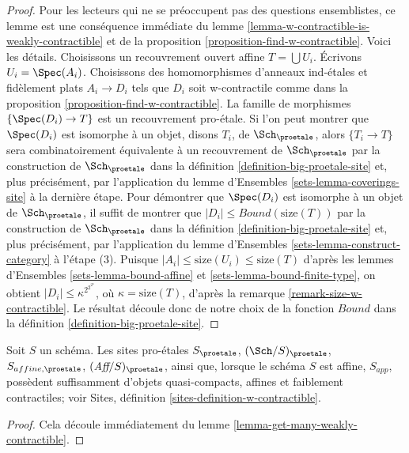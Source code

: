 \begin{proof}
Pour les lecteurs qui ne se préoccupent pas des questions ensemblistes,
ce lemme est une conséquence immédiate du
lemme \ref{lemma-w-contractible-is-weakly-contractible} et de la
proposition \ref{proposition-find-w-contractible}.
Voici les détails.
Choisissons un recouvrement ouvert affine $T = \bigcup U_i$. Écrivons $U_i = \Spec(A_i)$.
Choisissons des homomorphismes d'anneaux ind-\'etales et fidèlement plats $A_i \to D_i$
tels que $D_i$ soit w-contractile comme dans la
proposition \ref{proposition-find-w-contractible}.
La famille de morphismes $\{\Spec(D_i) \to T\}$ est un
recouvrement pro-\'etale.
Si l'on peut montrer que $\Spec(D_i)$ est isomorphe à un objet, disons $T_i$,
de $\Sch_\proetale$, alors $\{T_i \to T\}$ sera combinatoirement
équivalente à un recouvrement de $\Sch_\proetale$ par la construction
de $\Sch_\proetale$ dans la définition \ref{definition-big-proetale-site}
et, plus précisément, par l'application du
lemme d'Ensembles \ref{sets-lemma-coverings-site} à la dernière étape.
Pour démontrer que $\Spec(D_i)$ est isomorphe à un objet de
$\Sch_\proetale$, il suffit de montrer que
$|D_i| \leq Bound(\text{size}(T))$ par la construction
de $\Sch_\proetale$ dans la définition \ref{definition-big-proetale-site}
et, plus précisément, par l'application du
lemme d'Ensembles \ref{sets-lemma-construct-category} à l'étape (3).
Puisque $|A_i| \leq \text{size}(U_i) \leq \text{size}(T)$
d'après les lemmes d'Ensembles \ref{sets-lemma-bound-affine} et
\ref{sets-lemma-bound-finite-type}, on obtient
$|D_i| \leq \kappa^{2^{2^{2^\kappa}}}$, où $\kappa = \text{size}(T)$,
d'après la remarque \ref{remark-size-w-contractible}.
Le résultat découle donc de notre choix de la fonction $Bound$ dans la
définition \ref{definition-big-proetale-site}.
\end{proof}

\begin{lemma}
\label{lemma-proetale-enough-w-contractible}
Soit $S$ un schéma. Les sites pro-\'etales
$S_\proetale$, $(\Sch/S)_\proetale$, $S_{affine, \proetale}$,
$(\textit{Aff}/S)_\proetale$, ainsi que, lorsque le schéma $S$ est affine, $S_{app}$,
possèdent suffisamment d'objets quasi-compacts, affines et faiblement contractiles;
voir Sites, définition \ref{sites-definition-w-contractible}.
\end{lemma}

\begin{proof}
Cela découle immédiatement du lemme \ref{lemma-get-many-weakly-contractible}.
\end{proof}

